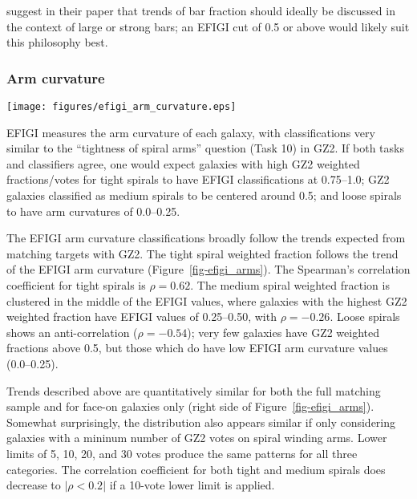 \documentclass[useAMS,usenatbib]{mn2e}
\begin{document}
\citet{mas11c} suggest in their paper that trends of bar fraction should ideally be discussed in the context of large or strong bars; an EFIGI cut of 0.5 or above would likely suit this philosophy best. 

\subsubsection{Arm curvature}

\begin{figure*}
\texttt{[image: figures/efigi\_arm\_curvature.eps]}
\caption{EFIGI arm curvature classifications compared to their GZ2 weighted fractions for the presence of a bar. Data on the left are for the 3,411 galaxies in both samples; the subset of 2,099 face-on galaxies is on the right. Dashed lines on the top and bottom pairs of plots show the one-to-one correlation, a Gaussian with $\mu=0.5$ and $\sigma=0.25$, and the one-to-one anti-correlation, respectively. 
\label{fig-efigi_arms}}
\end{figure*}

EFIGI measures the arm curvature of each galaxy, with classifications very similar to the ``tightness of spiral arms'' question (Task 10) in GZ2. If both tasks and classifiers agree, one would expect galaxies with high GZ2 weighted fractions/votes for tight spirals to have EFIGI classifications at 0.75--1.0; GZ2 galaxies classified as medium spirals to be centered around 0.5; and loose spirals to have arm curvatures of 0.0--0.25. 

The EFIGI arm curvature classifications broadly follow the trends expected from matching targets with GZ2. The tight spiral weighted fraction follows the trend of the EFIGI arm curvature (Figure~\ref{fig-efigi_arms}). The Spearman's correlation coefficient for tight spirals is $\rho=0.62$. The medium spiral weighted fraction is clustered in the middle of the EFIGI values, where galaxies with the highest GZ2 weighted fraction have EFIGI values of 0.25--0.50, with $\rho=-0.26$. Loose spirals shows an anti-correlation ($\rho=-0.54$); very few galaxies have GZ2 weighted fractions above 0.5, but those which do have low EFIGI arm curvature values (0.0--0.25). 

Trends described above are quantitatively similar for both the full matching sample and for face-on galaxies only (right side of Figure~\ref{fig-efigi_arms}). Somewhat surprisingly, the distribution also appears similar if only considering galaxies with a mininum number of GZ2 votes on spiral winding arms. Lower limits of 5, 10, 20, and 30 votes produce the same patterns for all three categories. The correlation coefficient for both tight and medium spirals does decrease to $|\rho<0.2|$ if a 10-vote lower limit is applied. 
\end{document}

